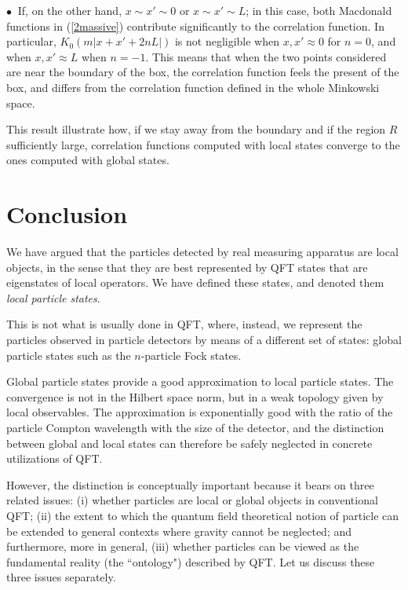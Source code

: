 \documentclass[10pt, nofootinbib]{revtex4}
\begin{document}
$\bullet\ $ If, on the other hand, $x \sim x' \sim 0$ or $x \sim x' \sim L$; in
this case, both Macdonald functions in (\ref{2massive}) contribute
significantly to the correlation function.  In particular, $K_0(m
|x+x'+2nL|)$ is not negligible when $x,x' \approx 0$ for $n=0$, and
when $x,x' \approx L$ when $n=-1$.  This means that when the two
points considered are near the boundary of the box, the correlation
function feels the present of the box, and differs from the
correlation function defined in the whole Minkowski space.

This result illustrate how, if we stay away from the boundary and if
the region $R$ sufficiently large, correlation functions computed
with local states converge to the ones computed with global states. 


\section{Conclusion}

We have argued that the particles detected by real measuring apparatus
are local objects, in the sense that they are best represented by QFT
states that are eigenstates of local operators.  We have defined these
states, and denoted them \emph{local particle states}.

This is not what is usually done in QFT, where, instead, we represent
the particles observed in particle detectors by means of a different
set of states: global particle states such as the $n$-particle
Fock states.  

Global particle states provide a good approximation to local particle
states.  The convergence is not in the Hilbert space norm, but in
a weak topology given by local observables.  The approximation is
exponentially good with the ratio of the particle Compton wavelength
with the size of the detector, and the distinction between global and
local states can therefore be safely neglected in concrete
utilizations of QFT. 

However, the distinction is conceptually important because it bears on
three related issues: (i) whether particles are local or global
objects in conventional QFT; (ii) the extent to which the quantum
field theoretical notion of particle can be extended to general
contexts where gravity cannot be neglected; and furthermore, more in
general, (iii) whether particles can be viewed as
the fundamental reality (the ``ontology") described by QFT. Let us
discuss these three issues separately.
\end{document}
